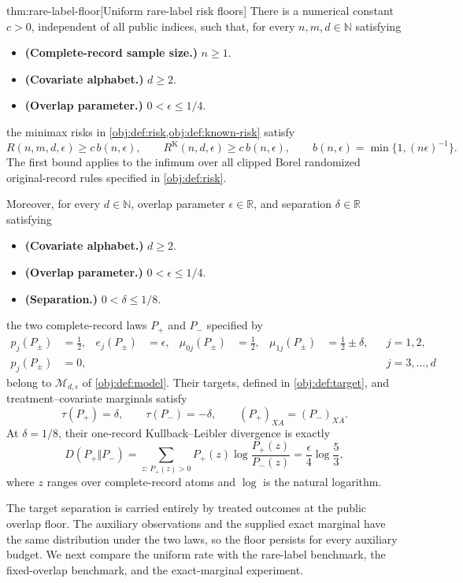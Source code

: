 \documentclass[11pt]{article}
\begin{document}
\begin{theoremv}{thm:rare-label-floor}[Uniform rare-label risk floors]
There is a numerical constant \(c>0\), independent of all public indices, such that, for every \(n,m,d\in\mathbb N\) satisfying
\begin{itemize}
\item \textbf{(Complete-record sample size.)} \(n\ge 1\).
\item \textbf{(Covariate alphabet.)} \(d\ge 2\).
\item \textbf{(Overlap parameter.)} \(0<\epsilon\le 1/4\).
\end{itemize}
the minimax risks in \cref{obj:def:risk,obj:def:known-risk} satisfy
\[
R(n,m,d,\epsilon)\ge c\,b(n,\epsilon),
\qquad
R^{\mathrm K}(n,d,\epsilon)\ge c\,b(n,\epsilon),
\qquad
b(n,\epsilon)=\min\{1,(n\epsilon)^{-1}\}.
\]
The first bound applies to the infimum over all clipped Borel randomized original-record rules specified in \cref{obj:def:risk}.

Moreover, for every \(d\in\mathbb N\), overlap parameter \(\epsilon\in\mathbb R\), and separation \(\delta\in\mathbb R\) satisfying
\begin{itemize}
\item \textbf{(Covariate alphabet.)} \(d\ge 2\).
\item \textbf{(Overlap parameter.)} \(0<\epsilon\le 1/4\).
\item \textbf{(Separation.)} \(0<\delta\le 1/8\).
\end{itemize}
the two complete-record laws \(P_+\) and \(P_-\) specified by
\[
\begin{aligned}
p_j(P_\pm)&=\frac12,
&
e_j(P_\pm)&=\epsilon,
&
\mu_{0j}(P_\pm)&=\frac12,
&
\mu_{1j}(P_\pm)&=\frac12\pm\delta,
&& j=1,2,\\
p_j(P_\pm)&=0,
&&&&&&&& j=3,\ldots,d
\end{aligned}
\]
belong to \(\mathcal M_{d,\epsilon}\) of \cref{obj:def:model}. Their targets, defined in \cref{obj:def:target}, and treatment–covariate marginals satisfy
\[
\tau(P_+)=\delta,
\qquad
\tau(P_-)=-\delta,
\qquad
(P_+)_{XA}=(P_-)_{XA}.
\]
At \(\delta=1/8\), their one-record Kullback--Leibler divergence is exactly
\[
D(P_+\Vert P_-)
=
\sum_{z:\,P_+(z)>0}
P_+(z)\log\frac{P_+(z)}{P_-(z)}
=
\frac{\epsilon}{4}\log\frac53,
\]
where \(z\) ranges over complete-record atoms and \(\log\) is the natural logarithm.
\end{theoremv}

The target separation is carried entirely by treated outcomes at the public overlap floor. The auxiliary observations and the supplied exact marginal have the same distribution under the two laws, so the floor persists for every auxiliary budget. We next compare the uniform rate with the rare-label benchmark, the fixed-overlap benchmark, and the exact-marginal experiment.
\end{document}
